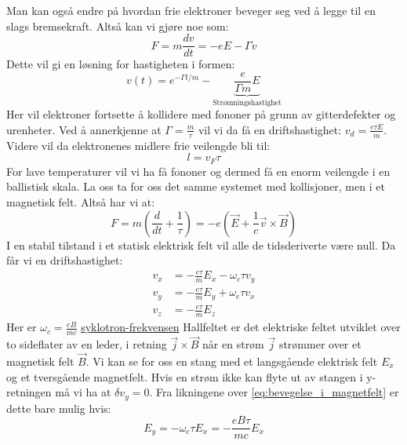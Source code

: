 \documentclass{article}
\begin{document}
Man kan også endre på hvordan frie elektroner beveger seg ved å legge til en slags bremsekraft. Altså kan vi gjøre noe som:
\begin{equation}
    F = m\frac{d v}{dt} = -e E - \Gamma v
\end{equation}
Dette vil gi en løsning for hastigheten i formen:
\begin{equation}
    v(t) = e^{- \Gamma t / m} - \underbrace{\frac{e}{\Gamma m} E}_{\text{Strømningshastighet}}
\end{equation}
Her vil elektroner fortsette å kollidere med fononer på grunn av gitterdefekter og urenheter. Ved å annerkjenne at $\Gamma = \frac{m}{\tau}$ vil vi da få en driftshastighet: $v_d = \frac{e \tau E}{m}$. Videre vil da elektronenes midlere frie veilengde bli til:
\begin{equation}
    l = v_F \tau
\end{equation}
For lave temperaturer vil vi ha få fononer og dermed få en enorm veilengde i en ballistisk skala.
La oss ta for oss det samme systemet med kollisjoner, men i et magnetisk felt. Altså har vi at:
\begin{equation}
    F = m \left(\frac{d}{dt} + \frac{1}{\tau}\right) = -e \left(\vec{E} + \frac{1}{c} \vec{v} \times \vec{B}\right)
\end{equation}
I en stabil tilstand i et statisk elektrisk felt vil alle de tidsderiverte være null. Da får vi en driftshastighet:
\begin{align}
    \label{eq:bevegelse_i_magnetfelt}
    v_x &= -\frac{e \tau}{m} E_x - \omega_c \tau v_y \\
    v_y &= -\frac{e \tau}{m} E_y + \omega_c \tau v_x \\
    v_z &= -\frac{e \tau}{m} E_z
\end{align}
Her er $\omega_c = \frac{e B}{m c}$ \underline{syklotron-frekvensen}
Hallfeltet er det elektriske feltet utviklet over to sideflater av en leder, i retning $\vec{j} \times \vec{B}$ når en strøm $\Vec{j}$ strømmer over et magnetisk felt $\vec{B}$. Vi kan se for oss en stang med et langsgående elektrisk felt $E_x$ og et tversgående magnetfelt. Hvis en strøm ikke kan flyte ut av stangen i y-retningen må vi ha at $\delta v_y = 0$. Fra likningene over \ref{eq:bevegelse_i_magnetfelt} er dette bare mulig hvis:
\begin{equation}
    E_y = - \omega_c \tau  E_x = - \frac{e B \tau}{mc} E_x
\end{equation}
\end{document}
